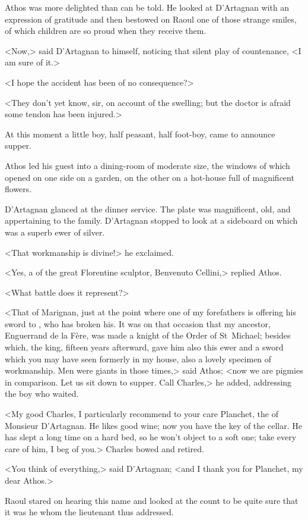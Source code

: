 Athos was more delighted than can be told. He looked at D'Artagnan with an expression of gratitude and then bestowed on Raoul one of those strange smiles, of which children are so proud when they receive them.

<Now,> said D'Artagnan to himself, noticing that silent play of countenance, <I am sure of it.>

<I hope the accident has been of no consequence?>

<They don't yet know, sir, on account of the swelling; but the doctor is afraid some tendon has been injured.>

At this moment a little boy, half peasant, half foot-boy, came to announce supper.

Athos led his guest into a dining-room of moderate size, the windows of which opened on one side on a garden, on the other on a hot-house full of magnificent flowers.

D'Artagnan glanced at the dinner service. The plate was magnificent, old, and appertaining to the family. D'Artagnan stopped to look at a sideboard on which was a superb ewer of silver.

<That workmanship is divine!> he exclaimed.

<Yes, a  of the great Florentine sculptor, Benvenuto Cellini,> replied Athos.

<What battle does it represent?>

<That of Marignan, just at the point where one of my forefathers is offering his sword to , who has broken his. It was on that occasion that my ancestor, Enguerrand de la Fère, was made a knight of the Order of St~Michael; besides which, the king, fifteen years afterward, gave him also this ewer and a sword which you may have seen formerly in my house, also a lovely specimen of workmanship. Men were giants in those times,> said Athos; <now we are pigmies in comparison. Let us sit down to supper. Call Charles,> he added, addressing the boy who waited.

<My good Charles, I particularly recommend to your care Planchet, the  of Monsieur D'Artagnan. He likes good wine; now you have the key of the cellar. He has slept a long time on a hard bed, so he won't object to a soft one; take every care of him, I beg of you.> Charles bowed and retired.

<You think of everything,> said D'Artagnan; <and I thank you for Planchet, my dear Athos.>

Raoul stared on hearing this name and looked at the count to be quite sure that it was he whom the lieutenant thus addressed.

